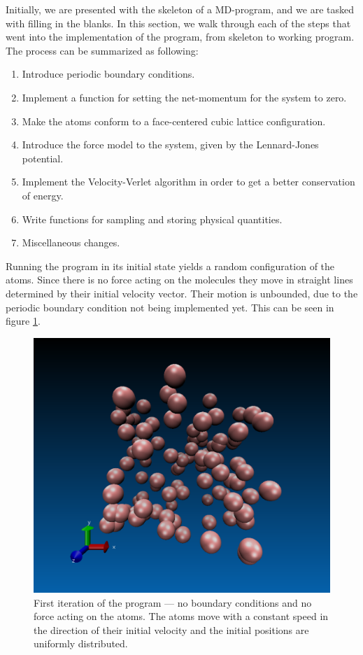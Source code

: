 \documentclass[a4paper]{article}
\begin{document}
    Initially, we are presented with the skeleton of a MD-program, and we are
    tasked with filling in the blanks. In this section, we walk through each of
    the steps that went into the implementation of the program, from skeleton
    to working program. The process can be summarized as following:
    
    \begin{enumerate}[1)]
        \item Introduce periodic boundary conditions.
        \item Implement a function for setting the net-momentum for the system to zero.
        \item Make the atoms conform to a face-centered cubic lattice configuration.
        \item Introduce the force model to the system, given by the Lennard-Jones potential.
        \item Implement the Velocity-Verlet algorithm in order to get a better
            conservation of energy.
        \item Write functions for sampling and storing physical quantities.
        \item Miscellaneous changes.
    \end{enumerate}
    
    Running the program in its initial state yields a random configuration of
    the atoms. Since there is no force acting on the molecules they move in
    straight lines determined by their initial velocity vector. Their motion is
    unbounded, due to the periodic boundary condition not being implemented
    yet. This can be seen in figure \ref{fig:first_iteration}.

    \begin{figure}
        \centering \includegraphics[width=0.4\linewidth]{first_iteration.png}
        \caption[Initial state of the program]{First iteration of the program --- no boundary conditions and
            no force acting on the atoms. The atoms move with a constant speed
            in the direction of their initial velocity and the initial
        positions are uniformly distributed.}
        \label{fig:first_iteration}
    \end{figure}
\end{document}
